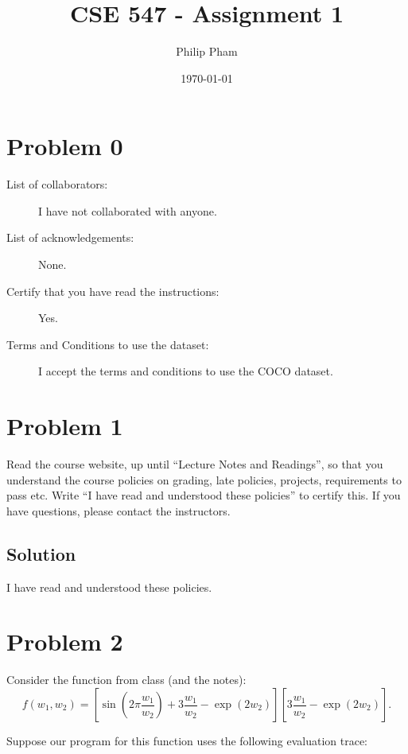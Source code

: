 \documentclass[letterpaper,11pt]{article}
\author{Philip Pham}
\date{\today}
\title{CSE 547 - Assignment 1}
\begin{document}
\maketitle

\section*{Problem 0}

\begin{description}
\item[List of collaborators:] I have not collaborated with anyone.
\item[List of acknowledgements:] None.
\item[Certify that you have read the instructions:] Yes.
\item[Terms and Conditions to use the dataset:] I accept the terms and
  conditions to use the COCO dataset.
\end{description}

\section*{Problem 1}

Read the course website, up until ``Lecture Notes and Readings'', so that you
understand the course policies on grading, late policies, projects, requirements
to pass etc. Write ``I have read and understood these policies'' to certify
this. If you have questions, please contact the instructors.

\subsection*{Solution}

I have read and understood these policies.

\section*{Problem 2}

Consider the function from class (and the notes):
\begin{equation}
  f\left(w_1,w_2\right) = \left[\sin\left(2\pi\frac{w_1}{w_2}\right) + 3\frac{w_1}{w_2} - \exp\left(2w_2\right)\right]\left[3\frac{w_1}{w_2} - \exp\left(2w_2\right)\right].
\end{equation}

Suppose our program for this function uses the following evaluation trace:
\end{document}
